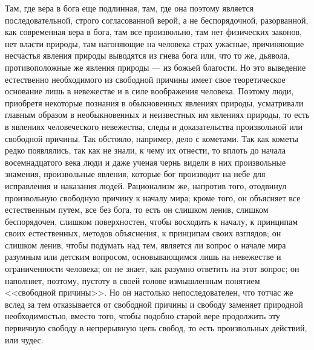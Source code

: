 \documentclass[12pt]{article}
\begin{document}
Там, где вера в бога еще подлинная, там, где она поэтому является последовательной, строго согласованной верой, а не беспорядочной, разорванной, как современная вера в бога, там все произвольно, там нет физических законов, нет власти природы, там нагоняющие на человека страх ужасные, причиняющие несчастья явления природы выводятся из гнева бога или, что то же, дьявола, противоположные же явления природы --- из божьей благости. Но это выведение естественно необходимого из свободной причины имеет свое теоретическое основание лишь в невежестве и в силе воображения человека. Поэтому люди, приобретя некоторые познания в обыкновенных явлениях природы, усматривали главным образом в необыкновенных и неизвестных им явлениях природы, то есть в явлениях человеческого невежества, следы и доказательства произвольной или свободной причины. Так обстояло, например, дело с кометами. Так как кометы редко появлялись, так как не знали, к чему их отнести, то вплоть до начала восемнадцатого века люди и даже ученая чернь видели в них произвольные знамения, произвольные явления, которые бог производит на небе для исправления и наказания людей. Рационализм же, напротив того, отодвинул произвольную свободную причину к началу мира; кроме того, он объясняет все естественным путем, все без бога, то есть он слишком ленив, слишком беспорядочен, слишком поверхностен, чтобы восходить к началу, к принципам своих естественных, методов объяснения, к принципам своих взглядов; он слишком ленив, чтобы подумать над тем, является ли вопрос о начале мира разумным или детским вопросом, основывающимся лишь на невежестве и ограниченности человека; он не знает, как разумно ответить на этот вопрос; он наполняет, поэтому, пустоту в своей голове измышленным понятием <<свободной причины>>. Но он настолько непоследователен, что тотчас же вслед за тем отказывается от свободной причины и свободу заменяет природной необходимостью, вместо того, чтобы подобно старой вере продолжить эту первичную свободу в непрерывную цепь свобод, то есть произвольных действий, или чудес. 
\end{document}
